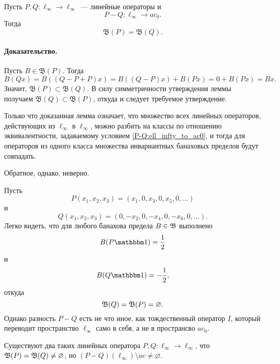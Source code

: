\begin{lemma}
	\label{thm:linear_op_equiv_ac0}
	Пусть $P,Q:\ell_\infty \to \ell_\infty$~--- линейные операторы и
	\begin{equation}\label{P-Q:ell_infty_to_ac0}
		P-Q : \ell_\infty \to ac_0
		.
	\end{equation}
	Тогда
	\begin{equation}
		\mathfrak{B}(P)=\mathfrak{B}(Q)
		.
	\end{equation}
\end{lemma}

\paragraph{Доказательство.}
Пусть $B\in \mathfrak{B}(P)$.
Тогда
\begin{equation}
	B(Qx) = B((Q-P+P)x) =
	B((Q-P)x)+B(Px) =
	0 + B(Px) =
	Bx
	.
\end{equation}
Значит, $\mathfrak{B}(P) \subset \mathfrak{B}(Q)$.
В силу симметричности утверждения леммы получаем $\mathfrak{B}(Q) \subset \mathfrak{B}(P)$,
откуда и следует требуемое утверждение.

Только что доказанная лемма означает, что множество всех линейных операторов,
действующих из $\ell_\infty$ в $\ell_\infty$, можно разбить на классы по отношению эквивалентности,
задаваемому условием \eqref{P-Q:ell_infty_to_ac0},
и тогда для операторов из одного класса множества инвариантных банаховых пределов будут совпадать.

Обратное, однако, неверно.

\begin{example}
	Пусть
	\begin{equation}
		P(x_1,x_2,x_3) = (x_1, 0, x_3, 0, x_5, 0, ...)
	\end{equation}
	и
	\begin{equation}
		Q(x_1,x_2,x_3) = (0, -x_2, 0, -x_4, 0, -x_6, 0, ...)
		.
	\end{equation}
	Легко видеть, что для любого банахова предела $B\in\mathfrak{B}$ выполнено
	\begin{equation}
		B(P\one) = \frac{1}{2}
	\end{equation}
	и
	\begin{equation}
		B(Q\one) = -\frac{1}{2}
		,
	\end{equation}
	откуда
	\begin{equation}
		\mathfrak{B}(Q) = \mathfrak{B}(P) = \varnothing
		.
	\end{equation}
	Однако разность $P-Q$ есть не что иное, как тождественный оператор $I$,
	который переводит пространство $\ell_\infty$ само в себя,
	а не в пространсво $ac_0$.
\end{example}


\begin{hypothesis}
	Существуют два таких линейных оператора $P, Q : \ell_\infty \to \ell_\infty$,
	что $\mathfrak{B}(P) = \mathfrak{B}(Q) \neq \varnothing$,
	но $(P-Q)(\ell_\infty) \setminus ac \neq \varnothing$.
\end{hypothesis}


